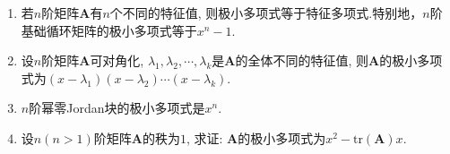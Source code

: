 \documentclass[../../main.tex]{subfiles}%
\begin{document}
\begin{proposition}[常见矩阵的极小多项式]\label{proposition:常见矩阵的极小多项式}
\begin{enumerate}[(1)]
\item 若\(n\)阶矩阵\(\boldsymbol{A}\)有\(n\)个不同的特征值, 则极小多项式等于特征多项式.特别地，\(n\)阶基础循环矩阵的极小多项式等于\(x^n - 1\).

\item 设\(n\)阶矩阵\(\boldsymbol{A}\)可对角化, \(\lambda_1,\lambda_2,\cdots,\lambda_k\)是\(\boldsymbol{A}\)的全体不同的特征值, 则\(\boldsymbol{A}\)的极小多项式为$(x - \lambda_1)(x - \lambda_2)\cdots(x - \lambda_k)$. 

\item \(n\)阶幂零Jordan块的极小多项式是\(x^n\).

\item 设\(n(n > 1)\)阶矩阵\(\boldsymbol{A}\)的秩为\(1\), 求证: \(\boldsymbol{A}\)的极小多项式为\(x^2-\mathrm{tr}(\boldsymbol{A})x\).
\end{enumerate}
\end{proposition}
\end{document}
